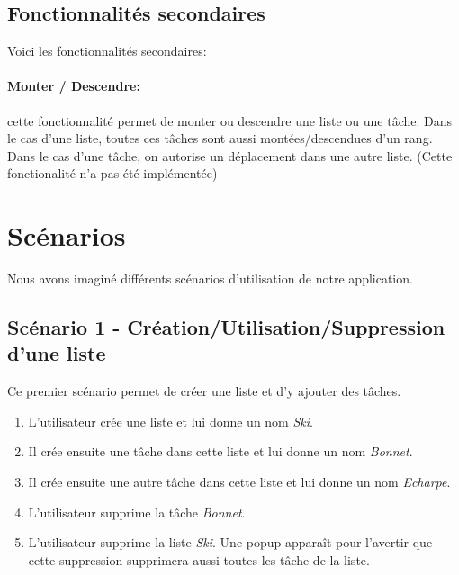\documentclass[a4paper,10pt]{article}
\begin{document}
\subsection{Fonctionnalités secondaires}
Voici les fonctionnalités secondaires:
\paragraph{Monter / Descendre:} cette fonctionnalité permet de monter ou descendre une liste ou une tâche. Dans le cas d'une liste, toutes ces tâches sont aussi montées/descendues d'un rang. Dans le cas d'une tâche, on autorise un déplacement dans une autre liste. (Cette fonctionalité n'a pas été implémentée)

\newpage
\section{Scénarios}
Nous avons imaginé différents scénarios d'utilisation de notre application.

\subsection{Scénario 1 - Création/Utilisation/Suppression d'une liste}
Ce premier scénario permet de créer une liste et d'y ajouter des tâches.
\begin{enumerate}
\item{L'utilisateur crée une liste et lui donne un nom \textit{Ski}.}
\item{Il crée ensuite une tâche dans cette liste et lui donne un nom \textit{Bonnet}.}
\item{Il crée ensuite une autre tâche dans cette liste et lui donne un nom \textit{Echarpe}.}
\item{L'utilisateur supprime la tâche \textit{Bonnet}.}
\item{L'utilisateur supprime la liste \textit{Ski}. Une popup apparaît pour l'avertir que cette suppression supprimera aussi toutes les tâche de la liste.}
\end{enumerate}
\end{document}
